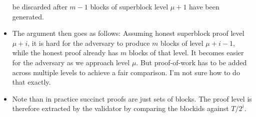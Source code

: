 \begin{itemize}
        be discarded after $m - 1$ blocks of superblock level $\mu + 1$ have
        been generated.
    \item
        The argument then goes as follows: Assuming honest superblock proof
        level $\mu + i$, it is hard for the adversary to produce $m$ blocks of
        level $\mu + i - 1$, while the honest proof already has $m$ blocks of
        that level. It becomes easier for the adversary as we approach level
        $\mu$. But proof-of-work has to be added across multiple levels to
        achieve a fair comparison. I'm not sure how to do that exactly.
    \item
        Note than in practice succinct proofs are just sets of blocks. The
        proof level is therefore extracted by the validator by comparing
        the blockids against $T / 2^i$.
\end{itemize}

